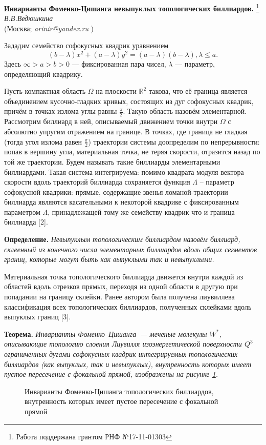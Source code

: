 \begin{center}{ \bf   Инварианты Фоменко-Цишанга невыпуклых топологических биллиардов.}%
\footnote{Работа поддержана грантом РНФ №17-11-01303}\\
 {\it В.В.Ведюшкина } \\
(Москва; {\it arinir@yandex.ru} )

\end{center}

Зададим семейство софокусных квадрик уравнением
$$(b-\lambda)x^2+(a-\lambda)y^2=(a-\lambda)(b-\lambda),   \lambda\leqslant a.    $$
Здесь $\infty> a> b>0$ --- фиксированная   пара чисел, $\lambda$ ---
параметр, определяющий квадрику.

Пусть  компактная область $\Omega$  на плоскости $\mathbb{R}^2$  такова,
что её граница  является объединением кусочно-гладких \!\!\;кривых,
состоящих из дуг софокусных квадрик, причём в точках излома  углы равны $\frac{\pi}{2}$. Такую область назовём элементарной.
Рассмотрим   биллиард  в ней, описываемый движением   точки внутри  $\Omega$ с
абсолютно упругим отражением на границе. В точках,
где граница   не гладкая
(тогда   угол излома  равен $\frac{\pi}{2}$)
 траектории системы  доопределим по непрерывности:  попав в вершину угла, материальная точка, не теряя скорости, отразится назад по той же траектории.  Будем называть такие биллиарды элементарными биллиардами.
 Такая система   интегрируема: помимо квадрата модуля вектора скорости   вдоль траекторий биллиарда сохраняется функция $\Lambda$ -- параметр софокусной квадрики: прямые, содержащие звенья ломаной-траектории биллиарда являются касательными к некоторой квадрике с фиксированным параметром $\Lambda$, принадлежащей тому же семейству квадрик что и граница биллиарда [2].

\textbf{Определение.}
{\it Невыпуклым  топологическим   биллиардом   назовём биллиард,  склеенный из конечного числа элементарных биллиардов вдоль общих   сегментов границ, которые могут быть как выпуклыми так и невыпуклыми.}

Материальная точка  топологического биллиарда дви\-же\-т\-ся внутри каждой из областей вдоль отрезков прямых,
переходя из одной области в другую при попадании на границу склейки.
Ранее автором была получена ли\-у\-вил\-ле\-ва классификация всех  топологических биллиардов,
полученных склейками вдоль выпуклых границ [3].

\textbf{Теорема.}
{\it Инварианты Фоменко--Цишанга~--- меченые молекулы $W^*$,
описывающие топологию слоения Лиувилля изоэнергетической поверхности $Q^3$
ограниченных дугами софокусных квадрик интегрируемых топологических биллиардов (как выпуклых, так и невыпуклых),
внутренность которых имеет пустое пересечение с фокальной прямой,   изображены на рисунке \ref{moleculesSimple}.
}
 \begin{figure}[h!]

\caption{Инварианты Фоменко-Цишанга топологических    биллиардов, внутренность которых имеет пустое пересечение с фокальной прямой}
\label{moleculesSimple}
 \end{figure}


